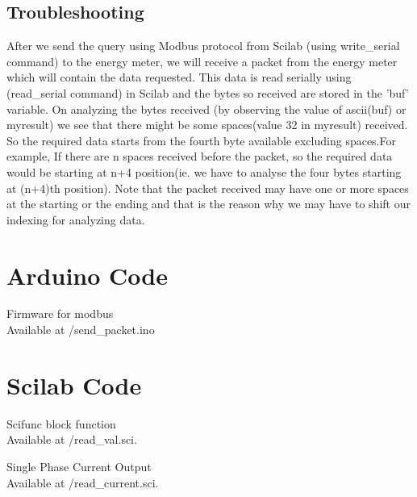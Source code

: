  \subsection{Troubleshooting}
  After we send the query using Modbus protocol from Scilab (using write\_serial command) to the energy meter, we will receive a packet from the energy meter which will contain the data requested. This data is read serially using (read\_serial command) in Scilab and the bytes so received are stored in the 'buf' variable. On analyzing the bytes received (by observing the value of ascii(buf) or myresult) we see that there might be some spaces(value 32 in myresult) received. So the required data starts from the fourth byte available excluding spaces.For example, If there are n spaces received before the packet, so the required data would be starting at n+4 position(ie. we have to analyse the four bytes starting at (n+4)th position). Note that the packet received may have one or more spaces at the starting or the ending and that is  the reason why we may have to shift our indexing for analyzing data.


\section{Arduino Code}
\label{sec:firmware-modbus}

\begin{ardcode}
{Firmware for modbus \\ Available at \LocMODardbrief/send\_packet.ino}
\label{ard:firmware-modbus}

\end{ardcode}

\section{Scilab Code}
\label{sec:modbus-scilab-code}

\begin{scicode}
{Scifunc block function \\ Available at
  \LocMODscibrief/read\_val.sci.} 
\label{sci:current-modbus}

\end{scicode}

\begin{scicode}
{Single Phase Current Output \\  Available at
  \LocMODscibrief/read\_current.sci.} 
\label{sci:current-modbus}

\end{scicode}

